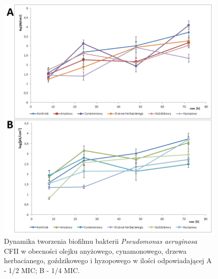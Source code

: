 \documentclass[11pt,a4paper]{report}
\begin{document}
\begin{figure}[!h]
\begin{center}
\includegraphics[scale=0.7]{img/cfii-a.png}
\caption{Dynamika tworzenia biofilmu bakterii \textit{Pseudomonas aeruginosa} CFII w obecności olejku anyżowego, cynamonowego, drzewa herbacianego, goździkowego i hyzopowego w ilości odpowiadającej A - 1/2 MIC; B - 1/4 MIC.}\label{cfii-a}
\end{center} 
\end{figure}
\end{document}
